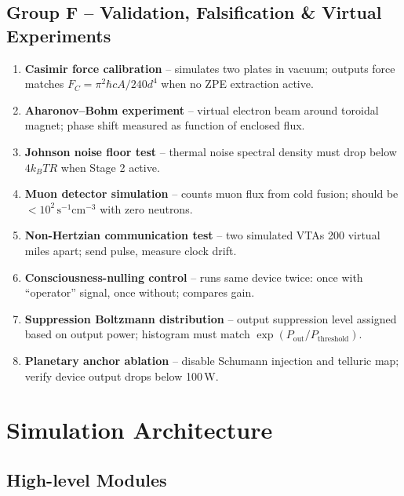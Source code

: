 \documentclass[11pt]{article}
\begin{document}
\subsection{Group F -- Validation, Falsification \& Virtual Experiments}
\begin{enumerate}[nosep,start=41]
    \item \textbf{Casimir force calibration} -- simulates two plates in vacuum; outputs force matches $F_C = \pi^2\hbar c A/240d^4$ when no ZPE extraction active.
    \item \textbf{Aharonov--Bohm experiment} -- virtual electron beam around toroidal magnet; phase shift measured as function of enclosed flux.
    \item \textbf{Johnson noise floor test} -- thermal noise spectral density must drop below $4k_BTR$ when Stage 2 active.
    \item \textbf{Muon detector simulation} -- counts muon flux from cold fusion; should be $<10^2\,\text{s}^{-1}\text{cm}^{-3}$ with zero neutrons.
    \item \textbf{Non-Hertzian communication test} -- two simulated VTAs 200 virtual miles apart; send pulse, measure clock drift.
    \item \textbf{Consciousness-nulling control} -- runs same device twice: once with ``operator'' signal, once without; compares gain.
    \item \textbf{Suppression Boltzmann distribution} -- output suppression level assigned based on output power; histogram must match $\exp(P_{\text{out}}/P_{\text{threshold}})$.
    \item \textbf{Planetary anchor ablation} -- disable Schumann injection and telluric map; verify device output drops below 100\,W.
\end{enumerate}

\section{Simulation Architecture}

\subsection{High-level Modules}
\end{document}
